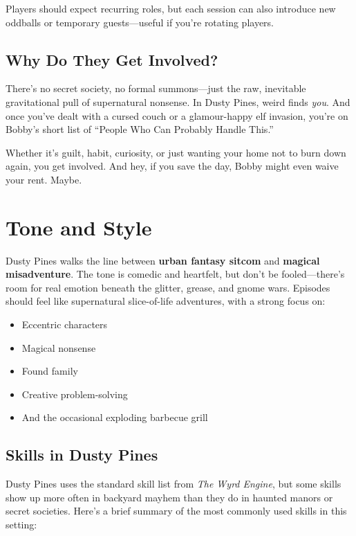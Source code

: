 Players should expect recurring roles, but each session can also introduce new oddballs or temporary guests---useful if you're rotating players.

\subsection{Why Do They Get Involved?}

There’s no secret society, no formal summons---just the raw, inevitable gravitational pull of supernatural nonsense. In Dusty Pines, weird finds \textit{you}. And once you’ve dealt with a cursed couch or a glamour-happy elf invasion, you’re on Bobby’s short list of “People Who Can Probably Handle This.”

Whether it’s guilt, habit, curiosity, or just wanting your home not to burn down again, you get involved. And hey, if you save the day, Bobby might even waive your rent. Maybe.

\section{Tone and Style}

Dusty Pines walks the line between \textbf{urban fantasy sitcom} and \textbf{magical misadventure}. The tone is comedic and heartfelt, but don’t be fooled---there's room for real emotion beneath the glitter, grease, and gnome wars. Episodes should feel like supernatural slice-of-life adventures, with a strong focus on:

\begin{itemize}
  \item Eccentric characters
  \item Magical nonsense
  \item Found family
  \item Creative problem-solving
  \item And the occasional exploding barbecue grill
\end{itemize}

\subsection{Skills in Dusty Pines}

Dusty Pines uses the standard skill list from \textit{The Wyrd Engine}, but some skills show up more often in backyard mayhem than they do in haunted manors or secret societies. Here’s a brief summary of the most commonly used skills in this setting:

